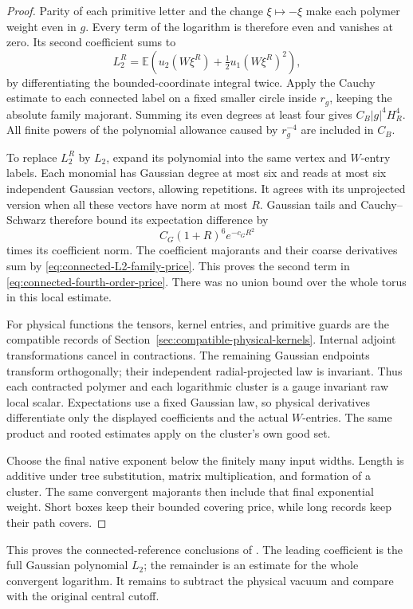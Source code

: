 \documentclass[11pt,reqno]{amsart}
\numberwithin{equation}{section}
\theoremstyle{definition}
\theoremstyle{remark}
\begin{document}
\begin{proof}
Parity of each primitive letter and
the change \(\xi\mapsto-\xi\) make each
polymer weight even in \(g\).
Every term of the logarithm is therefore
even and vanishes at zero.
Its second coefficient sums to
\[
            L_2^R=\mathbb E(u_2(W\xi^R)
                                      +\tfrac12u_1(W\xi^R)^2),
\]
by differentiating the bounded-coordinate
integral twice.
Apply the Cauchy estimate to each
connected label on a fixed smaller
circle inside \(r_g\), keeping the
absolute family majorant.
Summing its even degrees at least
four gives \(C_B|g|^4H_R^4\).
All finite powers of the polynomial
allowance caused by \(r_g^{-4}\)
are included in \(C_B\).

To replace \(L_2^R\) by \(L_2\),
expand its polynomial into the same
vertex and \(W\)-entry labels.
Each monomial has Gaussian degree
at most six and reads at most six
independent Gaussian vectors, allowing
repetitions.
It agrees with its unprojected version
when all these vectors have norm
at most \(R\).
Gaussian tails and Cauchy--Schwarz
therefore bound its expectation
difference by
\[
                       C_G(1+R)^6e^{-c_GR^2}
\]
times its coefficient norm.
The coefficient majorants and their
coarse derivatives sum by
\eqref{eq:connected-L2-family-price}.
This proves the second term in
\eqref{eq:connected-fourth-order-price}.
There was no union bound over the
whole torus in this local estimate.

For physical functions the tensors,
kernel entries, and primitive guards
are the compatible records of
Section~\ref{sec:compatible-physical-kernels}.
Internal adjoint transformations cancel
in contractions. The remaining Gaussian
endpoints transform orthogonally;
their independent radial-projected
law is invariant.
Thus each contracted polymer and each
logarithmic cluster is a gauge
invariant raw local scalar.
Expectations use a fixed Gaussian law,
so physical derivatives differentiate
only the displayed coefficients and
the actual \(W\)-entries.
The same product and rooted estimates
apply on the cluster's own good set.

Choose the final native exponent
below the finitely many input widths.
Length is additive under tree
substitution, matrix multiplication,
and formation of a cluster.
The same convergent majorants then
include that final exponential weight.
Short boxes keep their bounded
covering price, while long records
keep their path covers.
\end{proof}

This proves the connected-reference
conclusions of \cite[Theorem~24.4,
pp.~123--124, and Theorem~26.1,
pp.~139--140]{Main}.
The leading coefficient is the full
Gaussian polynomial \(L_2\);
the remainder is an estimate for
the whole convergent logarithm.
It remains to subtract the physical
vacuum and compare with the original
central cutoff.
\end{document}
